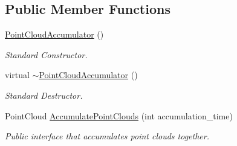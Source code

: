 \subsection*{\-Public \-Member \-Functions}
\begin{DoxyCompactItemize}
\item 
\hypertarget{class_point_cloud_accumulator_a8eacc283828c55b809058b54fd082433}{\hyperlink{class_point_cloud_accumulator_a8eacc283828c55b809058b54fd082433}{\-Point\-Cloud\-Accumulator} ()}\label{class_point_cloud_accumulator_a8eacc283828c55b809058b54fd082433}

\begin{DoxyCompactList}\small\item\em \-Standard \-Constructor. \end{DoxyCompactList}\item 
\hypertarget{class_point_cloud_accumulator_a48db4ff8ad89f27563691af475d8bc3a}{virtual \hyperlink{class_point_cloud_accumulator_a48db4ff8ad89f27563691af475d8bc3a}{$\sim$\-Point\-Cloud\-Accumulator} ()}\label{class_point_cloud_accumulator_a48db4ff8ad89f27563691af475d8bc3a}

\begin{DoxyCompactList}\small\item\em \-Standard \-Destructor. \end{DoxyCompactList}\item 
\-Point\-Cloud \hyperlink{class_point_cloud_accumulator_a24d93cde9ce3cce292779934f2b97ede}{\-Accumulate\-Point\-Clouds} (int accumulation\-\_\-time)
\begin{DoxyCompactList}\small\item\em \-Public interface that accumulates point clouds together. \end{DoxyCompactList}\end{DoxyCompactItemize}
